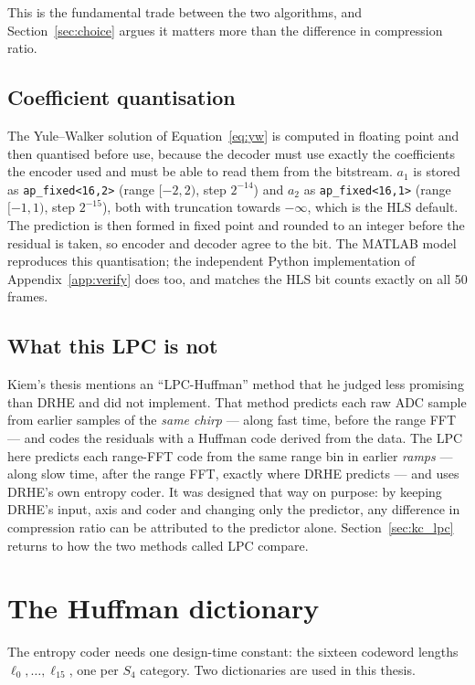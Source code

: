This is the fundamental trade between the two algorithms, and
Section~\ref{sec:choice} argues it matters more than the difference in
compression ratio.

\subsection{Coefficient quantisation}

The Yule--Walker solution of Equation~\eqref{eq:yw} is computed in floating
point and then quantised before use, because the decoder must use exactly the
coefficients the encoder used and must be able to read them from the
bitstream. $a_1$ is stored as \texttt{ap\_fixed<16,2>} (range $[-2, 2)$, step
$2^{-14}$) and $a_2$ as \texttt{ap\_fixed<16,1>} (range $[-1, 1)$, step
$2^{-15}$), both with truncation towards $-\infty$, which is the HLS default.
The prediction is then formed in fixed point and rounded to an integer before
the residual is taken, so encoder and decoder agree to the bit. The MATLAB model
reproduces this quantisation; the independent Python implementation
of Appendix~\ref{app:verify} does too, and matches the HLS bit counts exactly
on all 50 frames.


\subsection{What this LPC is not}
\label{sec:lpc_notkiem}

Kiem's thesis mentions an ``LPC-Huffman'' method \cite{meucci2022} that he
judged less promising than DRHE and did not implement. That method predicts
each raw ADC sample from earlier samples of the \emph{same chirp} --- along
fast time, before the range FFT --- and codes the residuals with a Huffman code
derived from the data. The LPC here predicts each range-FFT code from the same
range bin in earlier \emph{ramps} --- along slow time, after the range FFT,
exactly where DRHE predicts --- and uses DRHE's own entropy coder. It was
designed that way on purpose: by keeping DRHE's input, axis and coder and
changing only the predictor, any difference in compression ratio can be
attributed to the predictor alone. Section~\ref{sec:kc_lpc} returns to how the
two methods called LPC compare.

\section{The Huffman dictionary}
\label{sec:dict}

The entropy coder needs one design-time constant: the sixteen codeword lengths
$\ell_0, \ldots, \ell_{15}$, one per $S_4$ category. Two dictionaries are used
in this thesis.

